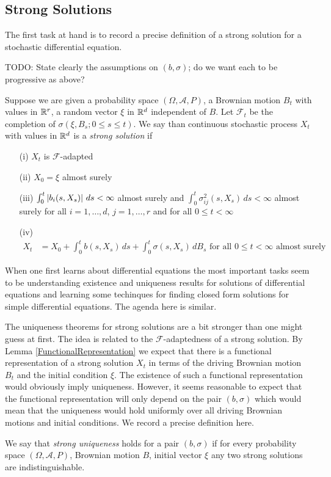 \subsection{Strong Solutions}

The first task at hand is to record a precise definition of a strong solution for a stochastic differential equation.

TODO: State clearly the assumptions on $(b,\sigma)$; do we want each to be progressive as above?

\begin{defn}Suppose we are given a probability space $(\Omega, \mathcal{A}, P)$, a Brownian motion $B_t$ with values in $\mathbb{R}^r$, a random vector $\xi$ in $\mathbb{R}^d$ independent of $B$.  Let $\mathcal{F}_t$ be the completion of $\sigma(\xi, B_s ; 0 \leq s \leq t)$.  We say than continuous stochastic process $X_t$ with values in $\mathbb{R}^d$ is a \emph{strong solution} if 
\begin{itemize}
\item[(i)] $X_t$ is $\mathcal{F}$-adapted 
\item[(ii)] $X_0 = \xi$ almost surely
\item[(iii)] $\int_0^t \left \vert b_i(s,X_s) \right \vert \, ds < \infty$ almost surely and $\int_0^t \sigma^2_{ij}(s, X_s) \, ds < \infty$ almost surely for all $i=1, \dotsc, d$, $j=1, \dotsc, r$ and for all $0 \leq t < \infty$
\item[(iv)] 
\begin{align*}
X_t &= X_0 + \int_0^t b(s,X_s) \, ds + \int_0^t \sigma(s,X_s) \, dB_s \text{ for all $0 \leq t < \infty$ almost surely}
\end{align*} 
\end{itemize}
\end{defn}

When one first learns about differential equations the most important tasks seem to be understanding existence and uniqueness results for solutions of differential equations and learning some techinques for finding closed form solutions for simple differential equations.  The agenda here is similar.

The uniqueness theorems for strong solutions are a bit stronger than one might guess at first.  The idea is related to the $\mathcal{F}$-adaptedness of a strong solution.  By Lemma \ref{FunctionalRepresentation} we expect that there is a functional representation of a strong solution $X_t$ in terms of the driving Brownian motion $B_t$ and the initial condition $\xi$.  The existence of such a functional representation would obviously imply uniqueness.  However, it seems reasonable to expect that the functional representation will only depend on the pair $(b,\sigma)$ which would mean that the uniqueness would hold uniformly over all driving Brownian motions and initial conditions.  We record a precise definition here.
\begin{defn}We say that \emph{strong uniqueness} holds for a pair $(b,\sigma)$ if for every probability space $(\Omega, \mathcal{A}, P)$, Brownian motion $B$, initial vector $\xi$ any two strong solutions are indistinguishable.
\end{defn}

